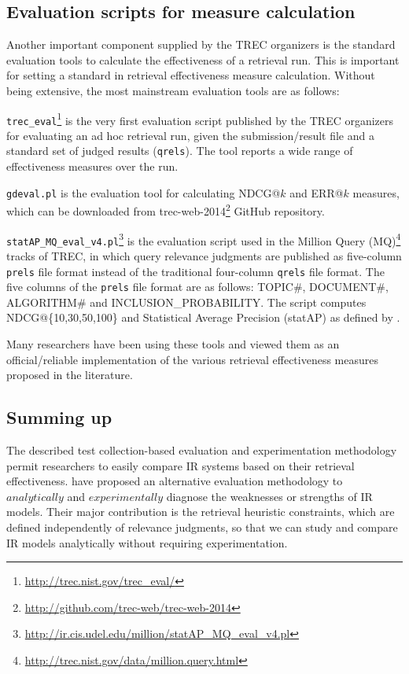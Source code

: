 \subsection{Evaluation scripts for measure calculation}
Another important component supplied by the TREC organizers is the standard evaluation tools to calculate the effectiveness of a retrieval run.
This is important for setting a standard in retrieval effectiveness measure calculation.
Without being extensive, the most mainstream evaluation tools are as follows:

\texttt{trec\_eval}\footnote{\url{http://trec.nist.gov/trec_eval/}} is the very first evaluation script published by the TREC organizers for evaluating an ad hoc retrieval run, given the submission/result file and a standard set of judged results (\texttt{qrels}). The tool reports a wide range of effectiveness measures over the run.

\texttt{gdeval.pl} is the evaluation tool for calculating NDCG@$k$ and ERR@$k$ measures, which can be downloaded from trec-web-2014\footnote{\url{http://github.com/trec-web/trec-web-2014}} GitHub repository.

\texttt{statAP\_MQ\_eval\_v4.pl}\footnote{\url{http://ir.cis.udel.edu/million/statAP_MQ_eval_v4.pl}} is the evaluation script used in the Million Query (MQ)\footnote{\url{http://trec.nist.gov/data/million.query.html}} tracks of TREC, in which query relevance judgments are published as five-column \texttt{prels} file format instead of the traditional four-column \texttt{qrels} file format.
The five columns of the \texttt{prels} file format are as follows: TOPIC\#, DOCUMENT\#, ALGORITHM\# and INCLUSION\_PROBABILITY. 
The script computes NDCG@\{10,30,50,100\} and Statistical Average Precision (statAP) as defined by \citet*{statAP}.

Many researchers have been using these tools and viewed them as an official/reliable implementation of the various retrieval effectiveness measures proposed in the literature.

\subsection{Summing up}
The described test collection-based evaluation and experimentation methodology \citep{sanderson} permit researchers to easily compare IR systems based on their retrieval effectiveness. 
\citet{heuristics,fang} have proposed an alternative evaluation methodology to $analytically$ and $experimentally$ diagnose the weaknesses or strengths of IR models.
Their major contribution is the retrieval heuristic constraints, which are defined independently of relevance judgments, so that we can study and compare IR models analytically without requiring experimentation.

